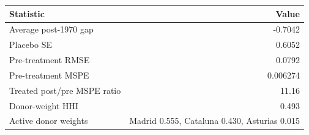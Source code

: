 \begin{tabular}{lr}
    \toprule
    Statistic & Value \\
    \midrule
    Average post-1970 gap & -0.7042 \\
    Placebo SE & 0.6052 \\
    Pre-treatment RMSE & 0.0792 \\
    Pre-treatment MSPE & 0.006274 \\
    Treated post/pre MSPE ratio & 11.16 \\
    Donor-weight HHI & 0.493 \\
    Active donor weights & \multicolumn{1}{l}{Madrid 0.555, Cataluna 0.430, Asturias 0.015} \\
    \bottomrule
\end{tabular}
